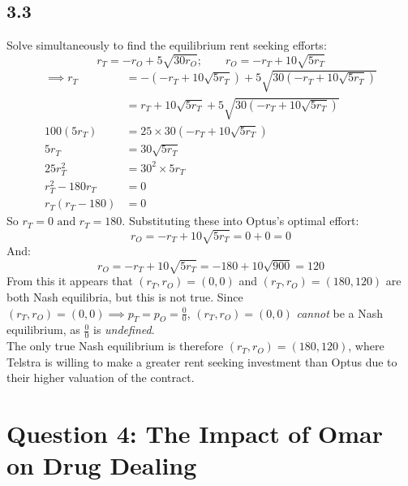 \documentclass{article}
\begin{document}
\subsection*{3.3}
Solve simultaneously to find the equilibrium rent seeking efforts:
$$r_{T} = -r_{O} + 5\sqrt{30r_{O}}; \qquad r_{O} = -r_{T} + 10\sqrt{5r_{T}}$$
\begin{align*}
    \implies r_{T} &= -(-r_{T} + 10\sqrt{5r_{T}}) + 5\sqrt{30(-r_{T} + 10\sqrt{5r_{T}})}\\
    &= r_{T} + 10\sqrt{5r_{T}} + 5\sqrt{30(-r_{T} + 10\sqrt{5r_{T}})}\\
    100(5r_{T}) &= 25 \times 30(-r_{T} + 10\sqrt{5r_{T}})\\
    5r_{T} &= 30\sqrt{5r_{T}}\\
    25r_{T}^2 &= 30^{2} \times 5r_{T}\\
    r_{T}^2 - 180r_{T} &= 0\\
    r_{T}(r_{T} - 180) &= 0
\end{align*}
So $r_{T} = 0 \mbox{ and } r_{T} = 180$. Substituting these into Optus's optimal effort:
$$r_{O} = -r_{T} + 10\sqrt{5r_{T}} = 0 + 0 = 0$$
And:
$$r_{O} = -r_{T} + 10\sqrt{5r_{T}} = -180 + 10\sqrt{900} = 120$$
From this it appears that $(r_{T}, r_{O}) = (0, 0)$ and $(r_{T}, r_{O}) = (180, 120)$ are both Nash equilibria, but this is not true. Since $(r_{T}, r_{O}) = (0, 0) \implies p_{T} = p_{O} = \frac{0}{0}$, $(r_{T}, r_{O}) = (0, 0)$ \textit{cannot} be a Nash equilibrium, as $\frac{0}{0}$ is \textit{undefined}.\\[2mm]
The only true Nash equilibrium is therefore $(r_{T}, r_{O}) = (180, 120)$, where Telstra is willing to make a greater rent seeking investment than Optus due to their higher valuation of the contract.


\section*{Question 4: The Impact of Omar on Drug Dealing}
\end{document}
